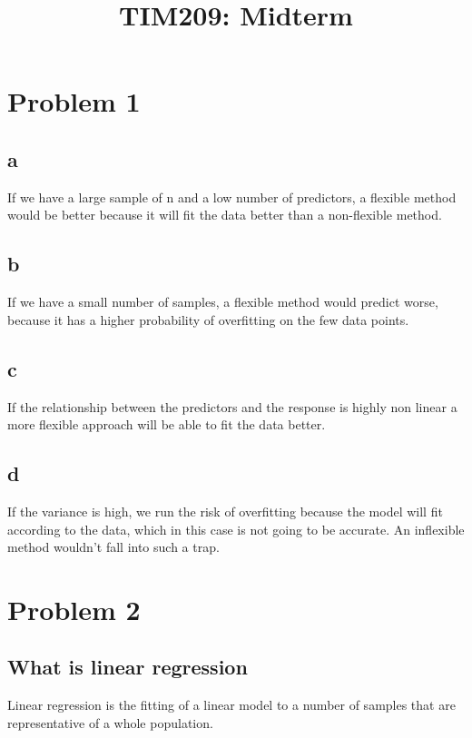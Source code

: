 \documentclass{article}
\title{TIM209: Midterm}
\begin{document}
 \maketitle \pagestyle{empty}

\section*{Problem 1}

\subsection*{a}
If we have a large sample of n and a low number of predictors, a flexible method would be better because it will fit the data better than a non-flexible method.\\

\subsection*{b}
If we have a small number of samples, a flexible method would predict worse, because it has a higher probability of overfitting on the few data points.\\

\subsection*{c}
If the relationship between the predictors and the response is highly non linear a more flexible approach will be able to fit the data better.\\

\subsection*{d}
If the variance is high, we run the risk of overfitting because the model will fit according to the data, which in this case is not going to be accurate. An inflexible method wouldn't fall into such a trap.\\

\section*{Problem 2}
\subsection*{What is linear regression}
Linear regression is the fitting of a linear model to a number of samples that are representative of a whole population.\\
\end{document}

